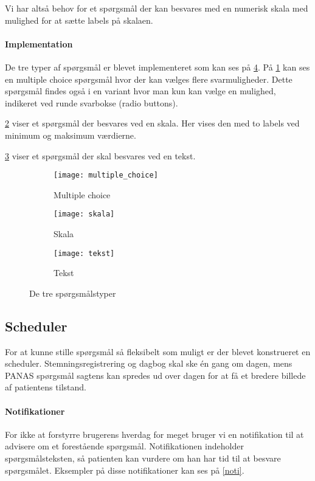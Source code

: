 Vi har altså behov for et spørgsmål der kan besvares med en numerisk skala med mulighed for at sætte labels på skalaen.

\paragraph{Implementation}
De tre typer af spørgsmål er blevet implementeret som kan ses på \cref{sporgsmål}.
På \cref{multi} kan ses en multiple choice spørgsmål hvor der kan vælges flere svarmuligheder.
Dette spørgsmål findes også i en variant hvor man kun kan vælge en mulighed, indikeret ved runde svarbokse (radio buttons).

\cref{skala} viser et spørgsmål der besvares ved en skala. 
Her vises den med to labels ved minimum og maksimum værdierne.

\cref{tekst} viser et spørgsmål der skal besvares ved en tekst. 


\begin{figure}
	\centering
	\begin{subfigure}[b]{0.3\textwidth}
		\texttt{[image: multiple\_choice]}
		\caption{Multiple choice}\label{multi}
	\end{subfigure}
	\quad
	\begin{subfigure}[b]{0.3\textwidth}
		\texttt{[image: skala]}
		\caption{Skala}\label{skala}
	\end{subfigure}
	\quad
	\begin{subfigure}[b]{0.3\textwidth}
		\texttt{[image: tekst]}
		\caption{Tekst}\label{tekst}
	\end{subfigure}
	\caption{De tre spørgsmålstyper}\label{sporgsmål}
\end{figure}


\subsection{Scheduler}
For at kunne stille spørgsmål så fleksibelt som muligt er der blevet konstrueret en scheduler.
Stemningsregistrering og dagbog skal ske én gang om dagen, mens PANAS spørgsmål sagtens kan spredes ud over dagen for at få et bredere billede af patientens tilstand.


\paragraph{Notifikationer}
For ikke at forstyrre brugerens hverdag for meget bruger vi en notifikation til at advisere om et forestående spørgsmål.
Notifikationen indeholder spørgsmålsteksten, så patienten kan vurdere om han har tid til at besvare spørgsmålet.
Eksempler på disse notifikationer kan ses på \cref{noti}.

